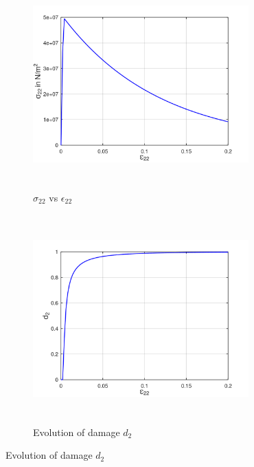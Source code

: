 \documentclass[12pt,a4paper,twoside,openright]{report}
\begin{document}
\FloatBarrier
\vspace*{1.5cm}
\begin{figure}[htbp!]\ContinuedFloat 
     \begin{subfigure}{0.4\textwidth}
         \includegraphics[width=8.3cm,height=8cm,keepaspectratio]{24.S22vsE22.png}
         \caption{$\sigma_{22}$ vs $\epsilon_{22}$}
         \label{fig:S22vsE22 2}
     \end{subfigure}   
     \hspace{1.8cm}
     \begin{subfigure}{0.4\textwidth}
         \centering
         \includegraphics[width=8.3cm,height=8cm,keepaspectratio]{24.d2.png}
         \caption{Evolution of damage $d_{2}$}
         \label{fig:Evolution of damage d2 2}
     \end{subfigure}
\end{figure}
\FloatBarrier
\end{document}
